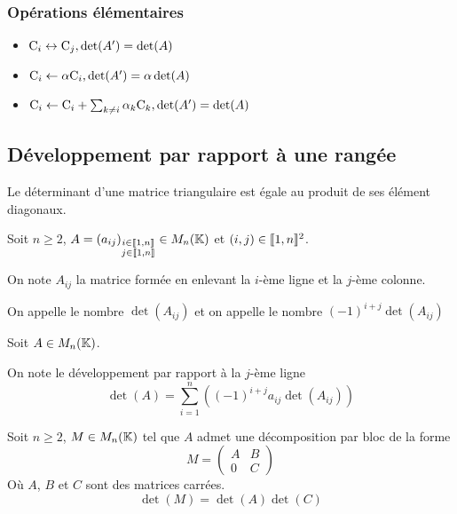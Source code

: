 \subsubsection{Opérations élémentaires}

\begin{prp}
  \begin{itemize}
    \item $\colonne_i \leftrightarrow \colonne_j, \det(A') = \det(A)$
    \item $\colonne_i \leftarrow \alpha \colonne_i, \det(A') = \alpha \det(A)$
    \item $\colonne_i \leftarrow \colonne_i + \sum_{k \neq i} \alpha_k \colonne_k, \det(A') = \det(A)$
  \end{itemize}
\end{prp}

\subsection{Développement par rapport à une rangée}

\begin{prp}
  Le déterminant d'une matrice triangulaire est égale au produit de ses élément diagonaux.
\end{prp}

\begin{dfn}
  Soit $n \geq 2$, $A = (a_{ij})_{\mind{i}{j}{n}{n}} \in M_n(\K)$ et
  $(i, j) \in \lib 1, n \rib^2$.

  On note $A_{ij}$ la matrice formée en enlevant la $i$-ème ligne et
  la $j$-ème colonne.

  On appelle  le nombre $\det(A_{ij})$
  et on appelle  le nombre
  $(-1)^{i + j}\det(A_{ij})$
\end{dfn}

\begin{prp}
  Soit $A \in M_n(\K)$.

  On note le développement par rapport à la $j$-ème ligne
  \[
    \det(A) = \sum^n_{i = 1} \left((-1)^{i + j} a_{ij} \det(A_{ij})\right)
  \]
\end{prp}

\begin{prp}
  Soit $n \geq 2$, $M \in M_n(\K)$ tel que $A$ admet une décomposition
  par bloc de la forme
  \[
    M =
    \begin{pmatrix}
      A & B \\
      0 & C 
    \end{pmatrix}
  \]
  Où $A$, $B$ et $C$ sont des matrices carrées.
  \[
    \det(M) = \det(A) \det(C)
  \]
\end{prp}

